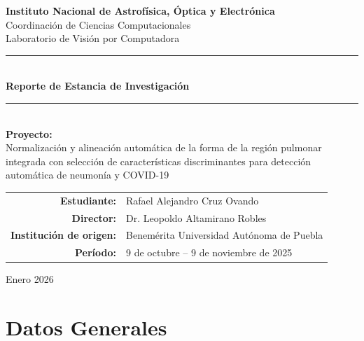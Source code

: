 \documentclass[12pt,a4paper]{article}
\begin{document}
\begin{titlepage}
    \centering
    \vspace*{1cm}

    {\Large\textbf{Instituto Nacional de Astrofísica, Óptica y Electrónica}}\\[0.3cm]
    {\large Coordinación de Ciencias Computacionales}\\[0.3cm]
    {\large Laboratorio de Visión por Computadora}\\[2cm]

    \rule{\textwidth}{1.5pt}\\[0.5cm]
    {\LARGE\bfseries Reporte de Estancia de Investigación}\\[0.5cm]
    \rule{\textwidth}{1.5pt}\\[1.5cm]

    {\Large\textbf{Proyecto:}}\\[0.3cm]
    {\large Normalización y alineación automática de la forma de la región pulmonar integrada con selección de características discriminantes para detección automática de neumonía y COVID-19}\\[2cm]

    \begin{tabular}{rl}
        \textbf{Estudiante:} & Rafael Alejandro Cruz Ovando \\[0.3cm]
        \textbf{Director:} & Dr. Leopoldo Altamirano Robles \\[0.3cm]
        \textbf{Institución de origen:} & Benemérita Universidad Autónoma de Puebla \\[0.3cm]
        \textbf{Período:} & 9 de octubre -- 9 de noviembre de 2025 \\
    \end{tabular}

    \vfill

    {\large Enero 2026}
\end{titlepage}

\tableofcontents
\newpage

\section*{Datos Generales}
\end{document}
